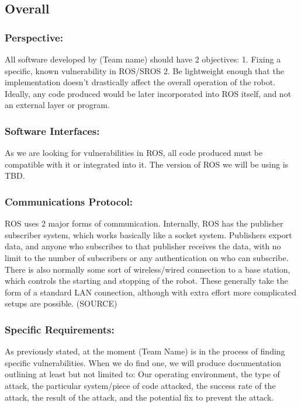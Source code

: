 \documentclass[IEEEtran,letterpaper,10pt,titlepage,draftclsnofoot,onecolumn]{article}
\begin{document}
\subsection*{Overall}

\subsubsection*{Perspective:}
All software developed by (Team name) should have 2 objectives:
1. Fixing a specific, known vulnerability in ROS/SROS
2. Be lightweight enough that the implementation doesn't drastically affect the overall operation of the robot. Ideally, any code produced would be later incorporated into ROS itself, and not an external layer or program.

\subsubsection*{Software Interfaces:}
As we are looking for vulnerabilities in ROS, all code produced must be compatible with it or integrated into it. The version of ROS we will be using is TBD.

\subsubsection*{Communications Protocol:}
ROS uses 2 major forms of communication. Internally, ROS has the publisher subscriber system, which works basically like a socket system.
Publishers export data, and anyone who subscribes to that publisher receives the data, with no limit to the number of
subscribers or any authentication on who can subscribe. There is also normally some sort of wireless/wired connection to a base
station, which controls the starting and stopping of the robot. These generally take the form of a standard LAN connection,
although with extra effort more complicated setups are possible. (SOURCE)

\subsubsection*{Specific Requirements:}
As previously stated, at the moment (Team Name) is in the process of finding specific vulnerabilities. When we do find one, we will produce documentation outlining at least but not limited to:
Our operating environment, the type of attack, the particular system/piece of code attacked, the success rate of the attack, the result of the attack, and the potential fix to prevent the attack.
\end{document}
